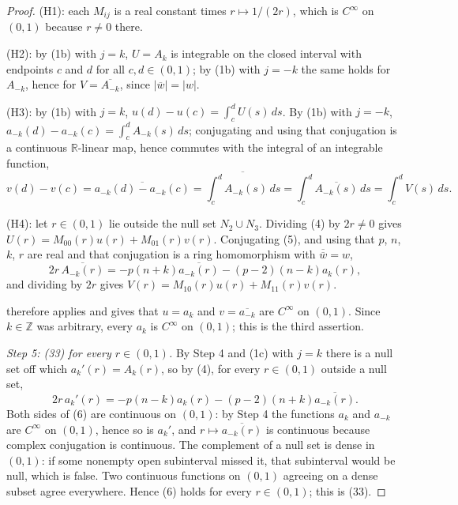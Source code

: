 \begin{proof}
(H1): each $M_{ij}$ is a real constant times $r\mapsto1/(2r)$, which is
$C^\infty$ on $(0,1)$ because $r\neq0$ there.

(H2): by (1b) with $j=k$, $U=A_k$ is integrable on the closed interval with
endpoints $c$ and $d$ for all $c,d\in(0,1)$; by (1b) with $j=-k$ the same holds
for $A_{-k}$, hence for $V=\overline{A_{-k}}$, since $|\overline{w}|=|w|$.

(H3): by (1b) with $j=k$, $u(d)-u(c)=\int_c^dU(s)\,ds$.  By (1b) with $j=-k$,
$a_{-k}(d)-a_{-k}(c)=\int_c^dA_{-k}(s)\,ds$; conjugating and using that
conjugation is a continuous $\mathbb{R}$-linear map, hence commutes with the
integral of an integrable function,
\[
  v(d)-v(c)=\overline{a_{-k}(d)-a_{-k}(c)}
  =\overline{\int_c^dA_{-k}(s)\,ds}=\int_c^d\overline{A_{-k}(s)}\,ds
  =\int_c^dV(s)\,ds .
\]

(H4): let $r\in(0,1)$ lie outside the null set $N_2\cup N_3$.  Dividing (4) by
$2r\neq0$ gives $U(r)=M_{00}(r)u(r)+M_{01}(r)v(r)$.  Conjugating (5), and using
that $p$, $n$, $k$, $r$ are real and that conjugation is a ring homomorphism
with $\overline{\overline{w}}=w$,
\[
  2r\,\overline{A_{-k}(r)}=-p(n+k)\overline{a_{-k}(r)}-(p-2)(n-k)a_k(r),
\]
and dividing by $2r$ gives $V(r)=M_{10}(r)u(r)+M_{11}(r)v(r)$.

 therefore applies and gives that $u=a_k$ and
$v=\overline{a_{-k}}$ are $C^\infty$ on $(0,1)$.  Since $k\in\mathbb{Z}$ was
arbitrary, every $a_k$ is $C^\infty$ on $(0,1)$; this is the third assertion.

\emph{Step 5: (33) for every $r\in(0,1)$.}  By Step 4 and (1c) with $j=k$ there
is a null set off which $a_k'(r)=A_k(r)$, so by (4), for every
$r\in(0,1)$ outside a null set,
\begin{equation}\tag{6}
  2r\,a_k'(r)=-p(n-k)a_k(r)-(p-2)(n+k)\overline{a_{-k}(r)} .
\end{equation}
Both sides of (6) are continuous on $(0,1)$: by Step 4 the functions $a_k$ and
$a_{-k}$ are $C^\infty$ on $(0,1)$, hence so is $a_k'$, and
$r\mapsto\overline{a_{-k}(r)}$ is continuous because complex conjugation is
continuous.  The complement of a null set is dense in $(0,1)$: if some nonempty
open subinterval missed it, that subinterval would be null, which is false.
Two continuous functions on $(0,1)$ agreeing on a dense subset agree
everywhere.  Hence (6) holds for every $r\in(0,1)$; this is (33).


\end{proof}
